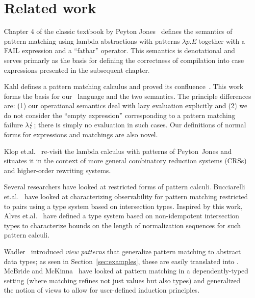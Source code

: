 
\section{Related work}\label{sec:related}

Chapter 4 of the classic textbook by Peyton Jones~\cite{spj_1987}
defines the semantics of pattern matching using lambda abstractions
with patterns $\lambda p.E$ together with a \textsf{FAIL} expression
and a ``fatbar'' operator. This semantics is
denotational and serves primarly as the basis for defining the
correctness of compilation into case expressions presented in
the subsequent chapter.

Kahl defines a pattern matching calculus and proved its
confluence~\cite{kahl_2004}. This work forms the basis for our
\lambdaPMC\ language and the two semantics. The principle differences
are: (1) our operational semantics deal with lazy evaluation
explicitly and (2) we do not consider the ``empty expression'' corresponding to a
pattern matching failure $\lambda\lightning$; there is simply no
evaluation in such cases.  Our definitions of normal forms for expressions
and matchings are also novel. %

Klop et.\@ al.\@~\cite{KLOP200816} re-visit the lambda calculus with
patterns of Peyton~Jones and situates it in the context of more
general combinatory reduction systems (CRSs) and higher-order
rewriting systems.

Several researchers have looked at restricted forms of pattern
calculi.  Bucciarelli et.\@ al.\@~\cite{bucciarelli_et_al_2015} have
looked at characterizing observability for pattern matching restricted
to pairs using a type system based on intersection types.  Inspired by
this work, Alves et.\@ al.\@~\cite{alves_et_al_2020} have defined a
type system based on non-idempotent intersection types to characterize
bounds on the length of normalization sequences for such pattern
calculi.

Wadler~\cite{wadler_1987} introduced \emph{view patterns} that
generalize pattern matching to abstract data types; as seen in Section~\ref{sec:examples},
these are easily translated into \lambdaPMC.
McBride and McKinna~\cite{mcbride_mckinna_2004} have looked at pattern
matching in a dependently-typed setting (where matching refines not
just values but also types) and generalized the notion of views to
allow for  user-defined induction principles.  




